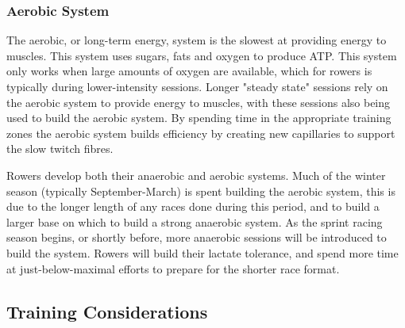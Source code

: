 \subsubsection{Aerobic System}
The aerobic, or long-term energy, system is the slowest at providing energy to muscles. This system uses sugars, fats and oxygen to produce ATP. This system only works when large amounts of oxygen are available, which for rowers is typically during lower-intensity sessions. Longer "steady state" sessions rely on the aerobic system to provide energy to muscles, with these sessions also being used to build the aerobic system. By spending time in the appropriate training zones the aerobic system builds efficiency by creating new capillaries to support the slow twitch fibres.

Rowers develop both their anaerobic and aerobic systems. Much of the winter season (typically September-March) is spent building the aerobic system, this is due to the longer length of any races done during this period, and to build a larger base on which to build a strong anaerobic system. As the sprint racing season begins, or shortly before, more anaerobic sessions will be introduced to build the system. Rowers will build their lactate tolerance, and spend more time at just-below-maximal efforts to prepare for the shorter race format.


\subsection{Training Considerations}
